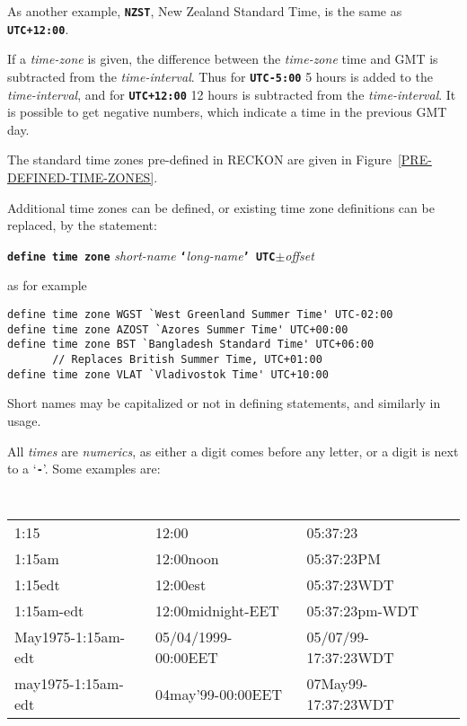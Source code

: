 \documentclass[12pt]{article}
\newcommand{\TT}[1]{{\tt \bfseries #1}}
\newenvironment{indpar}[1][0.3in]%
	{\begin{list}{}%
		     {\setlength{\itemsep}{0in}%
		      \setlength{\topsep}{0in}%
		      \setlength{\parsep}{1ex}%
		      \setlength{\labelwidth}{#1}%
		      \setlength{\leftmargin}{#1}%
		      \addtolength{\leftmargin}{\labelsep}}%
	 \item}%
	{\end{list}}
\begin{document}
As another example, \TT{NZST}, New Zealand Standard Time, is the same
as \TT{UTC+12:00}.

If a {\em time-zone} is given, the difference between the {\em time-zone}
time and GMT is subtracted from the {\em time-interval}.
Thus for \TT{UTC-5:00} 5 hours is added to the {\em time-interval},
and for \TT{UTC+12:00} 12 hours is subtracted from the {\em time-interval}.
It is possible to get negative numbers, which indicate a time in the previous
GMT day.

The standard time zones pre-defined in RECKON are given in
Figure~\ref{PRE-DEFINED-TIME-ZONES}.

Additional time zones can be defined, or existing time zone
definitions can be replaced, by the statement:
\begin{center}
\TT{define time zone} {\em short-name}
    \TT{`}{\em long-name}\TT{' UTC}$\pm${\em offset}
\end{center}

as for example
\begin{indpar}\begin{verbatim}
define time zone WGST `West Greenland Summer Time' UTC-02:00
define time zone AZOST `Azores Summer Time' UTC+00:00
define time zone BST `Bangladesh Standard Time' UTC+06:00
       // Replaces British Summer Time, UTC+01:00
define time zone VLAT `Vladivostok Time' UTC+10:00
\end{verbatim}\end{indpar}

Short names may be capitalized or not in defining statements, and
similarly in usage.

All {\em times} are {\em numerics}, as either a digit comes before
any letter, or a digit is next to a `\TT{-}'.  Some examples are:

\begin{indpar}[0.1in]
\tt
\begin{tabular}{@{}l@{~~}l@{~~}l@{}}
1:15	& 12:00   & 05:37:23 \\
1:15am	& 12:00noon   & 05:37:23PM \\
1:15edt	& 12:00est   & 05:37:23WDT \\
1:15am-edt	& 12:00midnight-EET   & 05:37:23pm-WDT \\
May1975-1:15am-edt	& 05/04/1999-00:00EET   & 05/07/99-17:37:23WDT \\
may1975-1:15am-edt	& 04may'99-00:00EET   & 07May99-17:37:23WDT \\
\end{tabular}
\end{indpar}
\end{document}
